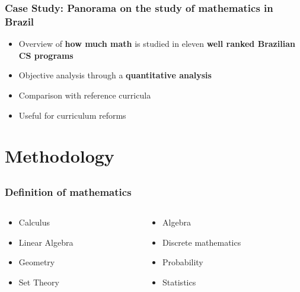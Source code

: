 \documentclass{beamer}
\begin{document}
\begin{frame}
\frametitle{Case Study: Panorama on the study of mathematics in Brazil}
\begin{itemize}
	\item Overview of \textbf{\textcolor{n_red}{how much math}} is studied in
	eleven \textbf{\textcolor{n_blue}{well ranked Brazilian CS programs}}
	\item Objective analysis through a \textbf{\textcolor{n_violet}{quantitative analysis}}
	\item Comparison with reference curricula
	\item Useful for curriculum reforms
\end{itemize}
\end{frame}


\section{Methodology}
\subsection{}

\begin{frame}
\frametitle{Definition of mathematics}
\begin{columns}
\begin{column}{0.5\textwidth}
	\begin{itemize}
		\item Calculus
		\item Linear Algebra
		\item Geometry
		\item Set Theory
	\end{itemize}
\end{column}
\begin{column}{0.5\textwidth}
	\begin{itemize}
		\item Algebra
		\item Discrete mathematics
		\item Probability
		\item Statistics
	\end{itemize}
\end{column}
\end{columns}

\end{frame}
\end{document}
